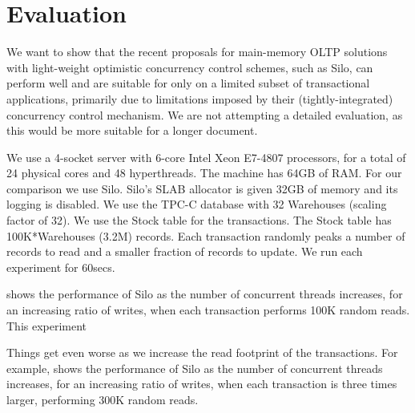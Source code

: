 
\section{Evaluation}

We want to show that the recent proposals for main-memory OLTP solutions with light-weight optimistic concurrency control schemes, such as Silo, can perform well and are suitable for only on a limited subset of transactional applications, primarily due to limitations imposed by their (tightly-integrated) concurrency control mechanism.  We are not attempting a detailed evaluation, as this would be more suitable for a longer document.

We use a 4-socket server with 6-core Intel Xeon E7-4807 processors, for a total of 24 physical cores and 48 hyperthreads. The machine has 64GB of RAM. 
For our comparison we use Silo.  Silo's SLAB allocator is given 32GB of memory and its logging is disabled. We use the TPC-C database with 32 Warehouses (scaling factor of 32). We use the Stock table for the transactions.  The Stock table has 100K*Warehouses (3.2M) records. Each transaction randomly peaks a number of records to read and a smaller fraction of records to update.  We run each experiment for 60secs.



 shows the performance of Silo as the number of concurrent threads increases, for an increasing ratio of writes, when each transaction performs 100K random reads.
This experiment

Things get even worse as we increase the read footprint of the transactions. For example,  shows the performance of Silo as the number of concurrent threads increases, for an increasing ratio of writes, when each transaction is three times larger, performing 300K random reads.




